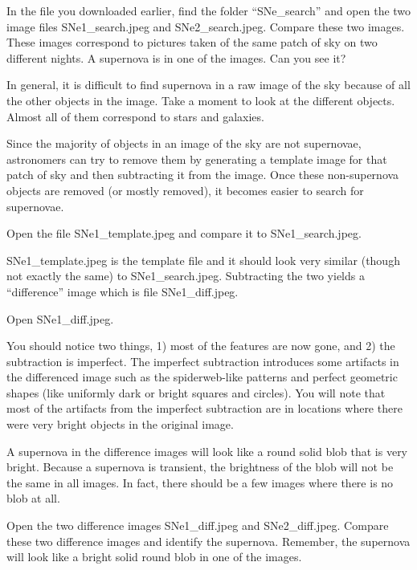 \begin{steps}
	\item In the file you downloaded earlier, find the folder “SNe\_search” and
open the two image files SNe1\_search.jpeg and SNe2\_search.jpeg.
Compare these two images. These images correspond to pictures taken
of the same patch of sky on two different nights. A supernova is in one of
the images. Can you see it?
\end{steps}

In general, it is difficult to find supernova in a raw image of the sky
because of all the other objects in the image. Take a moment to look at
the different objects. Almost all of them correspond to stars
and galaxies.

Since the majority of objects in an image of the sky are not supernovae,
astronomers can try to remove them by generating a template image for
that patch of sky and then subtracting it from the image. Once these
non-supernova objects are removed (or mostly removed), it becomes
easier to search for supernovae.

\begin{steps}
	\item Open the file SNe1\_template.jpeg and compare it to SNe1\_search.jpeg.
\end{steps}
SNe1\_template.jpeg is the template file and it should look very similar
(though not exactly the same) to SNe1\_search.jpeg. Subtracting the two
yields a “difference” image which is file SNe1\_diff.jpeg.
\begin{steps}
	\item Open SNe1\_diff.jpeg.
\end{steps}
You should notice two things, 1) most of the features are now gone, and 2) the subtraction is imperfect. The imperfect subtraction introduces some artifacts in the differenced
image such as the spiderweb-like patterns and perfect geometric shapes
(like uniformly dark or bright squares and circles). You will note that
most of the artifacts from the imperfect subtraction are in locations
where there were very bright objects in the original image.

A supernova in the difference images will look like a round solid blob
that is very bright. Because a supernova is transient, the brightness of
the blob will not be the same in all images. In fact, there should be a few
images where there is no blob at all.

\begin{steps}
	\item Open the two difference images SNe1\_diff.jpeg and SNe2\_diff.jpeg.
	Compare these two difference images and identify the supernova.
	Remember, the supernova will look like a bright solid round blob in one
	of the images.
\end{steps}

